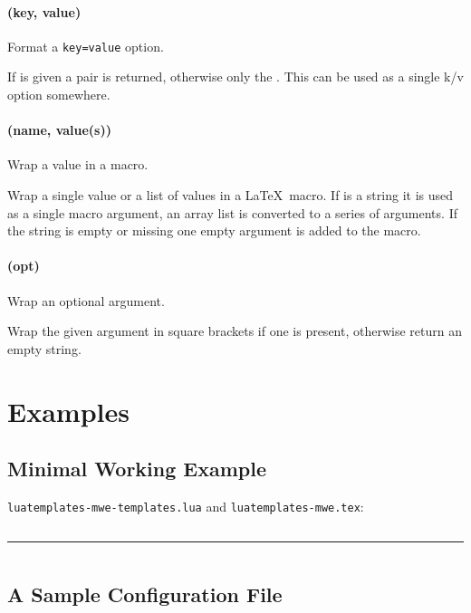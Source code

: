 \documentclass{scrartcl}
\begin{document}
\paragraph{ (key, value)}

Format a \texttt{key=value} option.

If  is given a \value{key=value} pair is returned, otherwise only
the .  This can be used as a single k/v option somewhere.


\paragraph{ (name, value(s))}

Wrap a value in a macro.

Wrap a single value or a list of values in a \LaTeX\ macro. If  is
a string it is used as a single macro argument, an array list is converted to a
series of arguments. If the string is empty or missing one empty argument is
added to the macro.


\paragraph{ (opt)}

Wrap an optional argument.

Wrap the given argument in square brackets if one is present, otherwise return
an empty string.


\pagebreak
\section{Examples}
\label{sec:examples}

\subsection{Minimal Working Example}
\label{sec:mwe}

\noindent
\texttt{luatemplates-mwe-templates.lua} and \texttt{luatemplates-mwe.tex}:

\inputminted{lua}{luatemplates-mwe-templates.lua}

\hrule

\inputminted{tex}{luatemplates-mwe.tex}

\pagebreak


\subsection{A Sample Configuration File}
\label{sec:basic-sample-config}
\end{document}
